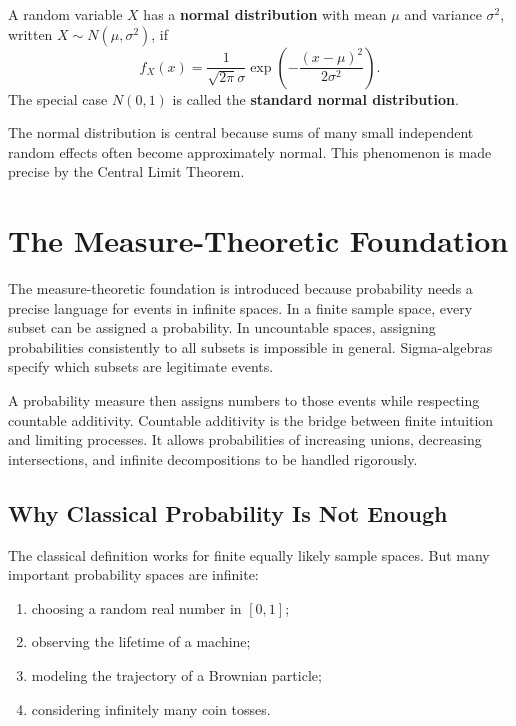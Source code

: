 \begin{definition}
A random variable $X$ has a \textbf{normal distribution} with mean $\mu$ and variance $\sigma^2$, written $X\sim N(\mu,\sigma^2)$, if
\[
    f_X(x)=\frac{1}{\sqrt{2\pi}\sigma}\exp\left(-\frac{(x-\mu)^2}{2\sigma^2}\right).
\]
The special case $N(0,1)$ is called the \textbf{standard normal distribution}.
\end{definition}

\begin{remark}
The normal distribution is central because sums of many small independent random effects often become approximately normal. This phenomenon is made precise by the Central Limit Theorem.
\end{remark}

\section{The Measure-Theoretic Foundation}


The measure-theoretic foundation is introduced because probability needs a precise language for events in infinite spaces. In a finite sample space, every subset can be assigned a probability. In uncountable spaces, assigning probabilities consistently to all subsets is impossible in general. Sigma-algebras specify which subsets are legitimate events.

A probability measure then assigns numbers to those events while respecting countable additivity. Countable additivity is the bridge between finite intuition and limiting processes. It allows probabilities of increasing unions, decreasing intersections, and infinite decompositions to be handled rigorously.

\subsection{Why Classical Probability Is Not Enough}

The classical definition works for finite equally likely sample spaces. But many important probability spaces are infinite:
\begin{enumerate}
    \item choosing a random real number in $[0,1]$;
    \item observing the lifetime of a machine;
    \item modeling the trajectory of a Brownian particle;
    \item considering infinitely many coin tosses.
\end{enumerate}

